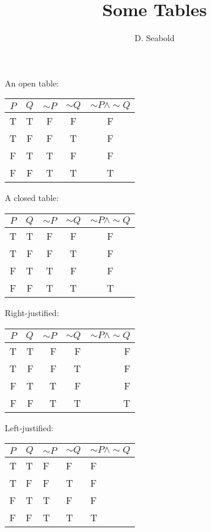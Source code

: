 \documentclass[12pt]{article}
\begin{document}
\title{Some Tables}
\author{D. Seabold}

\maketitle

An open table:

\medskip

\begin{tabular}{c|c|c|c|c}
$P$ & $Q$ & $\sim P$ & $\sim Q$ & $\sim P \wedge \sim Q$\\ \hline

T & T & F & F & F \\
T & F & F & T & F \\
F & T & T & F & F \\
F & F & T & T & T 
\end{tabular}

\bigskip

A closed table:

\medskip

\begin{tabular}{|c|c|c|c|c|} \hline
$P$ & $Q$ & $\sim P$ & $\sim Q$ & $\sim P \wedge \sim Q$\\ \hline

T & T & F & F & F \\ \hline
T & F & F & T & F \\ \hline
F & T & T & F & F \\ \hline
F & F & T & T & T\\ \hline
\end{tabular}

\bigskip

Right-justified:

\medskip

\begin{tabular}{|r|r|r|r|r|} \hline
$P$ & $Q$ & $\sim P$ & $\sim Q$ & $\sim P \wedge \sim Q$\\ \hline

T & T & F & F & F \\ \hline
T & F & F & T & F \\ \hline
F & T & T & F & F \\ \hline
F & F & T & T & T\\ \hline
\end{tabular}

\bigskip

Left-justified:

\medskip

\begin{tabular}{|l|l|l|l|l|} \hline
$P$ & $Q$ & $\sim P$ & $\sim Q$ & $\sim P \wedge \sim Q$\\ \hline

T & T & F & F & F \\ \hline
T & F & F & T & F \\ \hline
F & T & T & F & F \\ \hline
F & F & T & T & T\\ \hline
\end{tabular}

 
\end{document}

